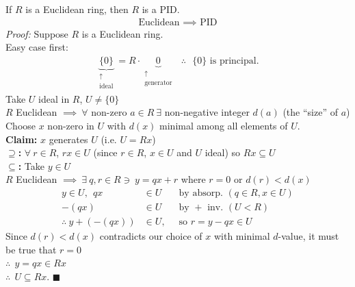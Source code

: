 \begin{theorem}
    If $R$ is a Euclidean ring, then $R$ is a PID.
    \begin{align}
        \boxed{\text{ Euclidean }\implies \text{ PID }}\nonumber
    \end{align}
    \textit{Proof:} Suppose $R$ is a Euclidean ring. \\ \steezybreak
    \noindent Easy case first:
    \begin{align}
        \underbrace{\{0\}}_{\substack{\uparrow \\  \text{ideal}}} = R\cdot \underbrace{0}_{\substack{\uparrow \\ \text{generator}}} \ \ \ \therefore \ \ \ \{0\} \text{ is principal}. \nonumber
    \end{align}
    Take $U$ ideal in $R$, $U\neq \{0\}$ \\
    \noindent $R$ Euclidean $\implies \ \forall$ non-zero $a\in R \ \exists $ non-negative integer
    $d(a)$ (the ``size'' of $a$) \\
    \noindent Choose $x$ non-zero in $U$ with $d(x)$ minimal among all elements of $U$. \\
    \noindent \textbf{Claim:} $x$ generates $U$ (i.e. $U=Rx$) \\
    \noindent \textbf{$\supseteq$:} $\forall \ r \in R$, $rx\in U$ (since $r\in R$, $x\in U$ and $U$
    ideal) so $Rx\subseteq U$ \\
    \noindent \textbf{$\subseteq$:} Take $y\in U$ \\
    \noindent $R$ Euclidean $\implies \ \exists \ q,r \in R \ni \ y=qx+r$ where $r=0$ or $d(r)<d(x)$
    \\

    \begin{align}
        y\in U, \ \ qx &\in U \ \ &\text{ by absorp. } (q\in R, x\in U) \nonumber \\
        -(qx) &\in U \ \ \ &\text{ by }+ \text{ inv. }(U<R) \nonumber \\
        \therefore \ y+(-(qx)) &\in U, \ &\text{ so }r=y-qx \in U \nonumber
    \end{align}
    Since $d(r)<d(x)$ contradicts our choice of $x$ with minimal $d$-value, it must be true that
    $r=0$ \\
    \noindent $\therefore \ \ y=qx \in Rx$ \\
    \noindent $\therefore \ \ U\subseteq Rx$. $\blacksquare$
\end{theorem}

